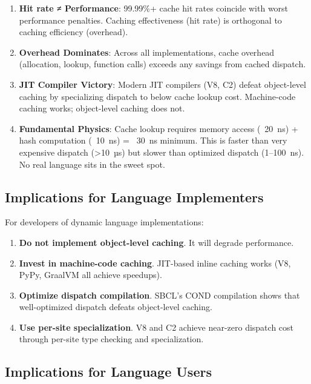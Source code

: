 \documentclass[sigplan,final]{acmart}
\begin{document}
\begin{enumerate}
  \item \textbf{Hit rate ≠ Performance}: 99.99\%+ cache hit rates coincide with worst performance
    penalties. Caching effectiveness (hit rate) is orthogonal to caching efficiency (overhead).

  \item \textbf{Overhead Dominates}: Across all implementations, cache overhead (allocation, lookup,
    function calls) exceeds any savings from cached dispatch.

  \item \textbf{JIT Compiler Victory}: Modern JIT compilers (V8, C2) defeat object-level caching by
    specializing dispatch to below cache lookup cost. Machine-code caching works; object-level
    caching does not.

  \item \textbf{Fundamental Physics}: Cache lookup requires memory access (~20~ns) + hash computation
    (~10~ns) = ~30~ns minimum. This is faster than very expensive dispatch (>10~µs) but slower than
    optimized dispatch (1--100~ns). No real language sits in the sweet spot.
\end{enumerate}

\subsection{Implications for Language Implementers}

For developers of dynamic language implementations:

\begin{enumerate}
  \item \textbf{Do not implement object-level caching}. It will degrade performance.

  \item \textbf{Invest in machine-code caching}. JIT-based inline caching works (V8, PyPy,
    GraalVM all achieve speedups).

  \item \textbf{Optimize dispatch compilation}. SBCL's COND compilation shows that well-optimized
    dispatch defeats object-level caching.

  \item \textbf{Use per-site specialization}. V8 and C2 achieve near-zero dispatch cost through
    per-site type checking and specialization.
\end{enumerate}

\subsection{Implications for Language Users}
\end{document}

